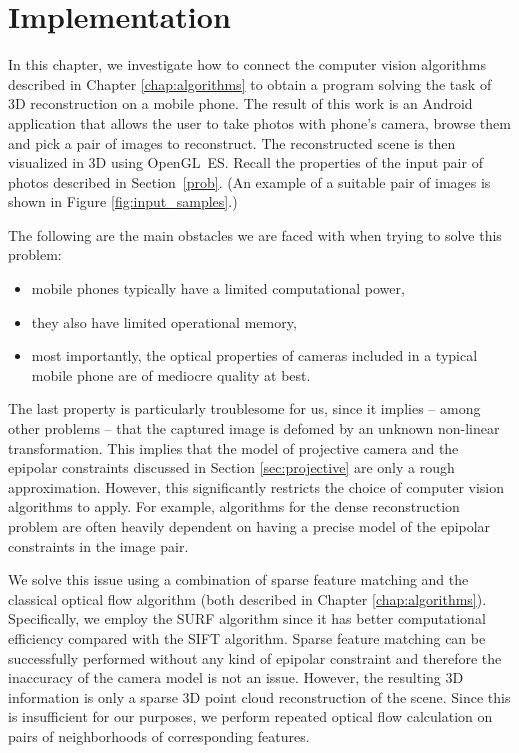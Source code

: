 \chapter{Implementation}
\label{chap:implementation}

In this chapter, we investigate how to connect the computer vision algorithms described in Chapter \ref{chap:algorithms} to obtain a program solving the task of 3D reconstruction on a mobile phone. 
The result of this work is an Android application that allows the user to take photos with phone's camera, browse them and pick a pair of images to reconstruct. 
The reconstructed scene is then visualized in 3D using OpenGL~ES.
Recall the properties of the input pair of photos described in Section~\ref{prob}.
(An example of a suitable pair of images is shown in Figure \ref{fig:input_samples}.)

The following are the main obstacles we are faced with when trying to solve this problem: 
\begin{itemize}
\item mobile phones typically have a limited computational power, 
\item they also have limited operational memory, 
\item most importantly, the optical properties of cameras included in a typical mobile phone are of mediocre quality at best. 
\end{itemize} 
The last property is particularly troublesome for us, since it implies -- among other problems -- that the captured image is defomed by an unknown non-linear transformation. 
This implies that the model of projective camera and the epipolar constraints discussed in Section \ref{sec:projective} are only a rough approximation. 
However, this significantly restricts the choice of computer vision algorithms to apply. 
For example, algorithms for the dense reconstruction problem are often heavily dependent on having a precise model of the epipolar constraints in the image pair. 

We solve this issue using a combination of sparse feature matching and the classical optical flow algorithm (both described in Chapter \ref{chap:algorithms}). 
Specifically, we employ the SURF algorithm since it has better computational efficiency compared with the SIFT algorithm.
Sparse feature matching can be successfully performed without any kind of epipolar constraint and therefore the inaccuracy of the camera model is not an issue. 
However, the resulting 3D information is only a sparse 3D point cloud reconstruction of the scene. 
Since this is insufficient for our purposes, we perform repeated optical flow calculation on pairs of neighborhoods of corresponding features. 

